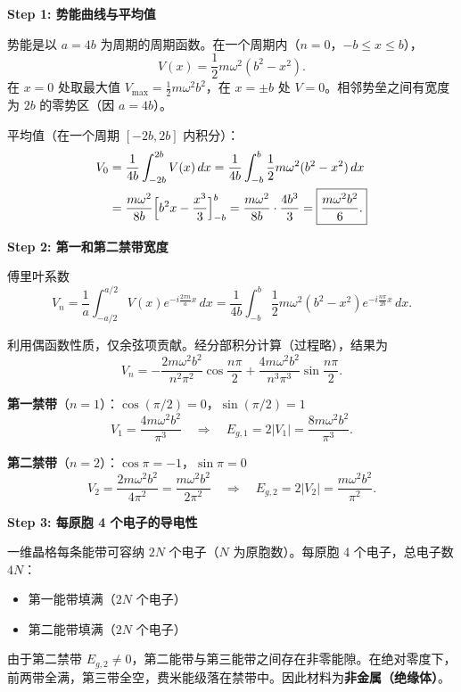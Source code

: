 \begin{derivationbox}[标准解题过程]
\textbf{Step 1: 势能曲线与平均值}

势能是以 $a=4b$ 为周期的周期函数。在一个周期内（$n=0$，$-b\le x\le b$），
\begin{equation}
V(x)=\frac12m\omega^2(b^2-x^2).
\end{equation}
在 $x=0$ 处取最大值 $V_{\max}=\frac12m\omega^2b^2$，在 $x=\pm b$ 处 $V=0$。相邻势垒之间有宽度为 $2b$ 的零势区（因 $a=4b$）。

平均值（在一个周期 $[-2b,2b]$ 内积分）：
\begin{align}
V_0&=\frac{1}{4b}\int_{-2b}^{2b}V(x)\,dx=\frac{1}{4b}\int_{-b}^{b}\frac12m\omega^2(b^2-x^2)\,dx \notag\\
&=\frac{m\omega^2}{8b}\Bigl[b^2x-\frac{x^3}{3}\Bigr]_{-b}^{b}
=\frac{m\omega^2}{8b}\cdot\frac{4b^3}{3}=\boxed{\frac{m\omega^2b^2}{6}.}
\end{align}

\textbf{Step 2: 第一和第二禁带宽度}

傅里叶系数
\begin{equation}
V_n=\frac{1}{a}\int_{-a/2}^{a/2}V(x)e^{-i\frac{2\pi n}{a}x}\,dx
=\frac{1}{4b}\int_{-b}^{b}\frac12m\omega^2(b^2-x^2)e^{-i\frac{n\pi}{2b}x}\,dx.
\end{equation}

利用偶函数性质，仅余弦项贡献。经分部积分计算（过程略），结果为
\begin{equation}
V_n=-\frac{2m\omega^2b^2}{n^2\pi^2}\cos\frac{n\pi}{2}+\frac{4m\omega^2b^2}{n^3\pi^3}\sin\frac{n\pi}{2}.
\end{equation}

\textbf{第一禁带}（$n=1$）：$\cos(\pi/2)=0$，$\sin(\pi/2)=1$
\begin{equation}
V_1=\frac{4m\omega^2b^2}{\pi^3}
\quad\Longrightarrow\quad
\boxed{E_{g,1}=2|V_1|=\frac{8m\omega^2b^2}{\pi^3}.}
\end{equation}

\textbf{第二禁带}（$n=2$）：$\cos\pi=-1$，$\sin\pi=0$
\begin{equation}
V_2=\frac{2m\omega^2b^2}{4\pi^2}=\frac{m\omega^2b^2}{2\pi^2}
\quad\Longrightarrow\quad
\boxed{E_{g,2}=2|V_2|=\frac{m\omega^2b^2}{\pi^2}.}
\end{equation}

\textbf{Step 3: 每原胞 4 个电子的导电性}

一维晶格每条能带可容纳 $2N$ 个电子（$N$ 为原胞数）。每原胞 4 个电子，总电子数 $4N$：
\begin{itemize}
    \item 第一能带填满（$2N$ 个电子）
    \item 第二能带填满（$2N$ 个电子）
\end{itemize}
由于第二禁带 $E_{g,2}\neq0$，第二能带与第三能带之间存在非零能隙。在绝对零度下，前两带全满，第三带全空，费米能级落在禁带中。因此材料为\textbf{非金属（绝缘体）}。


\end{derivationbox}
